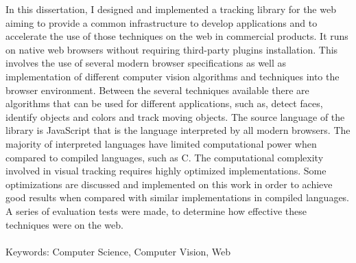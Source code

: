 In this dissertation, I designed and implemented a tracking library for the web aiming to provide a common infrastructure to develop applications and to accelerate the use of those techniques on the web in commercial products. It runs on native web browsers without requiring third-party plugins installation. This involves the use of several modern browser specifications as well as implementation of different computer vision algorithms and techniques into the browser environment. Between the several techniques available there are algorithms that can be used for different applications, such as, detect faces, identify objects and colors and track moving objects. The source language of the library is JavaScript that is the language interpreted by all modern browsers. The majority of interpreted languages have limited computational power when compared to compiled languages, such as C. The computational complexity involved in visual tracking requires highly optimized implementations. Some optimizations are discussed and implemented on this work in order to achieve good results when compared with similar implementations in compiled languages. A series of evaluation tests were made, to determine how effective these techniques were on the web.
\\\\
Keywords: Computer Science, Computer Vision, Web